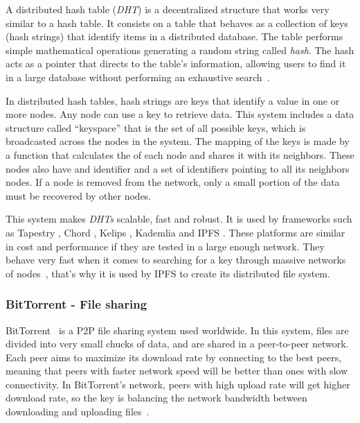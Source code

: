 A distributed hash table (\emph{DHT}) is a decentralized structure that works
very similar to a hash table. It consists on a table that behaves as a
collection of keys (hash strings) that identify items in a distributed database.
The table performs simple mathematical operations generating a random string
called \emph{hash}. The hash acts as a pointer that directs to the table's
information, allowing users to find it in a large database without performing an
exhaustive search~\cite{kaluszka2010distributed}.

In distributed hash tables, hash strings are keys that identify a value in one
or more nodes. Any node can use a key to retrieve data. This system includes a
data structure called ``keyspace'' that is the set of all possible keys, which
is broadcasted across the nodes in the system. The mapping of the keys is made
by a function that calculates the  of each node and shares it with
its neighbors. These nodes also have and identifier and a set of identifiers
pointing to all its neighbors nodes. If a node is removed from the network, only
a small portion of the data must be recovered by other
nodes\cite{kaluszka2010distributed}.

This system makes \emph{DHTs} scalable, fast and robust. It is used by
frameworks such as Tapestry \cite{zhao2004tapestry}, Chord
\cite{stoica2001chord}, Kelips \cite{gupta2003kelips}, Kademlia
\cite{maymounkov2002kademlia} and IPFS \cite{benet2014ipfs}. These platforms are
similar in cost and performance if they are tested in a large enough network.
They behave very fast when it comes to searching for a key through massive
networks of nodes~\cite{li2004comparing}, that's why it is used by IPFS to
create its distributed file system.

\subsubsection*{BitTorrent - File sharing}
\label{tech:sec:ipfs:bt}
BitTorrent~\cite{cohen2003incentives} is a P2P file sharing system used
worldwide. In this system, files are divided into very small chucks of data, and
are shared in a peer-to-peer network. Each peer aims to maximize its download
rate by connecting to the best peers, meaning that peers with faster network
speed will be better than ones with slow connectivity. In BitTorrent's network,
peers with high upload rate will get higher download rate, so the key is
balancing the network bandwidth between downloading and uploading
files~\cite{pouwelse2005bittorrent}.

